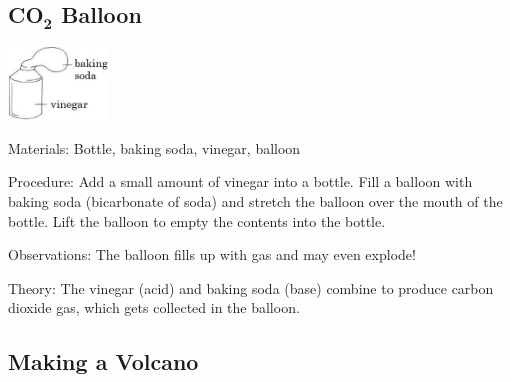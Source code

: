\begin{multicols}{2}
\subsection{\textbf{CO}$_\textbf{2}$ Balloon} 

\begin{center}
\includegraphics[width=0.2\textwidth]{./img/vso/co2-balloon.jpg}
\end{center}

\begin{description*}
\item[Materials:]{Bottle, baking soda, vinegar, balloon}
\item[Procedure:]{Add a small amount of vinegar into a bottle. Fill a balloon with baking soda (bicarbonate of soda) and stretch the balloon over the mouth of the bottle. Lift the balloon to empty the contents into the bottle.}
\item[Observations:]{The balloon fills up with gas and may even explode!}
\item[Theory:]{The vinegar (acid) and baking soda (base) combine to produce carbon dioxide gas, which gets collected in the balloon.}
\end{description*}

\subsection{Making a Volcano}  %



\end{multicols}
